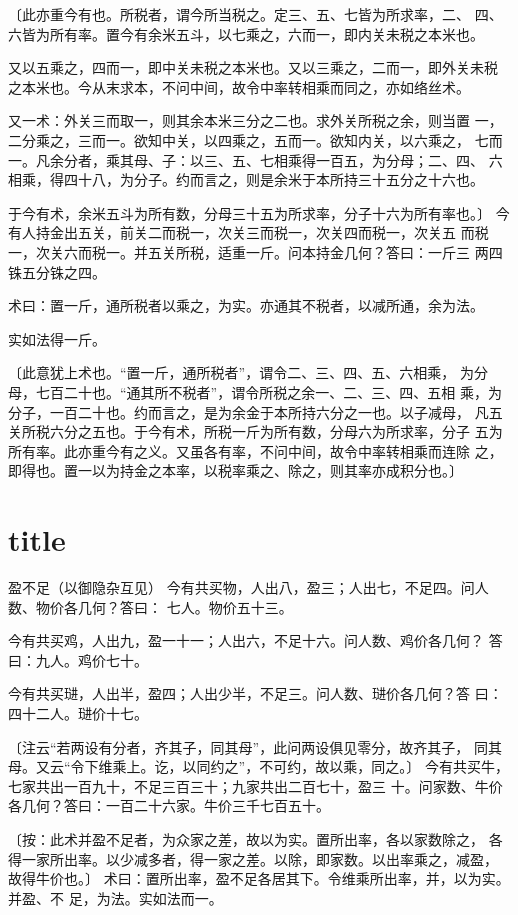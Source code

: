 \documentclass[a4paper,12pt,UTF8,twoside]{ctexbook}
\begin{document}
〔此亦重今有也。所税者，谓今所当税之。定三、五、七皆为所求率，二、 四、六皆为所有率。置今有余米五斗，以七乘之，六而一，即内关未税之本米也。

又以五乘之，四而一，即中关未税之本米也。又以三乘之，二而一，即外关未税 之本米也。今从末求本，不问中间，故令中率转相乘而同之，亦如络丝术。

又一术：外关三而取一，则其余本米三分之二也。求外关所税之余，则当置 一，二分乘之，三而一。欲知中关，以四乘之，五而一。欲知内关，以六乘之， 七而一。凡余分者，乘其母、子：以三、五、七相乘得一百五，为分母；二、四、 六相乘，得四十八，为分子。约而言之，则是余米于本所持三十五分之十六也。

于今有术，余米五斗为所有数，分母三十五为所求率，分子十六为所有率也。〕 今有人持金出五关，前关二而税一，次关三而税一，次关四而税一，次关五 而税一，次关六而税一。并五关所税，适重一斤。问本持金几何？答曰：一斤三 两四铢五分铢之四。

术曰：置一斤，通所税者以乘之，为实。亦通其不税者，以减所通，余为法。

实如法得一斤。

〔此意犹上术也。“置一斤，通所税者”，谓令二、三、四、五、六相乘， 为分母，七百二十也。“通其所不税者”，谓令所税之余一、二、三、四、五相 乘，为分子，一百二十也。约而言之，是为余金于本所持六分之一也。以子减母， 凡五关所税六分之五也。于今有术，所税一斤为所有数，分母六为所求率，分子 五为所有率。此亦重今有之义。又虽各有率，不问中间，故令中率转相乘而连除 之，即得也。置一以为持金之本率，以税率乘之、除之，则其率亦成积分也。〕 

\chapter{title}
盈不足（以御隐杂互见） 今有共买物，人出八，盈三；人出七，不足四。问人数、物价各几何？答曰： 七人。物价五十三。

今有共买鸡，人出九，盈一十一；人出六，不足十六。问人数、鸡价各几何？ 答曰：九人。鸡价七十。

今有共买琎，人出半，盈四；人出少半，不足三。问人数、琎价各几何？答 曰：四十二人。琎价十七。

〔注云“若两设有分者，齐其子，同其母”，此问两设俱见零分，故齐其子， 同其母。又云“令下维乘上。讫，以同约之”，不可约，故以乘，同之。〕 今有共买牛，七家共出一百九十，不足三百三十；九家共出二百七十，盈三 十。问家数、牛价各几何？答曰：一百二十六家。牛价三千七百五十。

〔按：此术并盈不足者，为众家之差，故以为实。置所出率，各以家数除之， 各得一家所出率。以少减多者，得一家之差。以除，即家数。以出率乘之，减盈， 故得牛价也。〕 术曰：置所出率，盈不足各居其下。令维乘所出率，并，以为实。并盈、不 足，为法。实如法而一。
\end{document}
